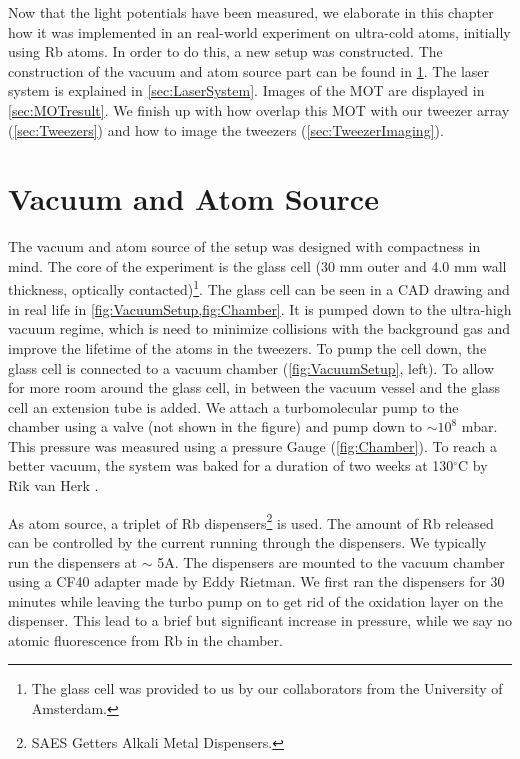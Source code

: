 Now that the light potentials have been measured, we elaborate in this chapter how it was implemented in an real-world experiment on ultra-cold atoms, initially using Rb atoms.
In order to do this, a new setup was constructed.
The construction of the vacuum and atom source part can be found in \cref{sec:VacuumAtom}.
The laser system is explained in \cref{sec:LaserSystem}.
Images of the MOT are displayed in \cref{sec:MOTresult}.
We finish up with how overlap this MOT with our tweezer array (\cref{sec:Tweezers}) and how to image the tweezers (\cref{sec:TweezerImaging}).

\section{Vacuum and Atom Source}\label{sec:VacuumAtom}

The vacuum and atom source of the setup was designed with compactness in mind. 
The core of the experiment is the glass cell (30 mm outer and 4.0 mm wall thickness, optically contacted)\footnote{The glass cell was provided to us by our collaborators from the University of Amsterdam.}.
The glass cell can be seen in a CAD drawing and in real life in \cref{fig:VacuumSetup,fig:Chamber}.
It is pumped down to the ultra-high vacuum regime, which is need to minimize collisions with the background gas and improve the lifetime of the atoms in the tweezers.
To pump the cell down, the glass cell is connected to a vacuum chamber (\cref{fig:VacuumSetup}, left).
To allow for more room around the glass cell, in between the vacuum vessel and the glass cell an extension tube is added.
We attach a turbomolecular pump to the chamber using a valve (not shown in the figure) and pump down to $\sim 10^{8}$ mbar.
This pressure was measured using a pressure Gauge (\cref{fig:Chamber}).
To reach a better vacuum, the system was baked for a duration of two weeks at 130${}^{\circ}$C by Rik van Herk \cite{Herk2022}.

As atom source, a triplet of Rb dispensers\footnote{SAES Getters Alkali Metal Dispensers.} is used.
The amount of Rb released can be controlled by the current running through the dispensers.
We typically run the dispensers at $\sim$ 5A.
The dispensers are mounted to the vacuum chamber using a CF40 adapter made by Eddy Rietman.
We first ran the dispensers for 30 minutes while leaving the turbo pump on to get rid of the oxidation layer on the dispenser.
This lead to a brief but significant increase in pressure, while we say no atomic fluorescence from Rb in the chamber.  

